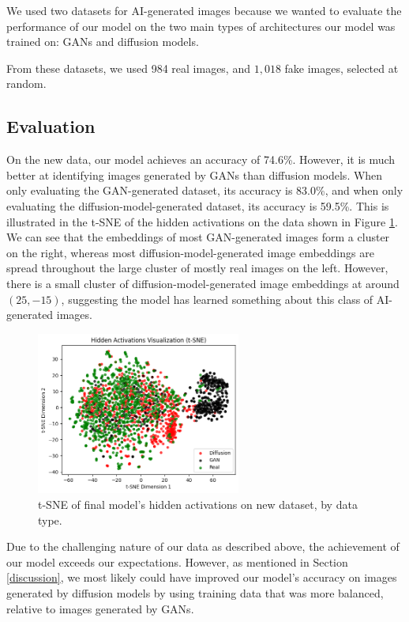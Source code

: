 \documentclass{article} %
\begin{document}
We used two datasets for AI-generated images because we wanted to evaluate the performance of our model on the two main types of architectures our model was trained on: GANs and diffusion models.

From these datasets, we used 984 real images, and $1,018$ fake images, selected at random.

\subsection{Evaluation}

On the new data, our model achieves an accuracy of 74.6\%. However, it is much better at identifying images generated by GANs than diffusion models. When only evaluating the GAN-generated dataset, its accuracy is 83.0\%, and when only evaluating the diffusion-model-generated dataset, its accuracy is 59.5\%. This is illustrated in the t-SNE of the hidden activations on the data shown in Figure \ref{fig:new_data_tsne}. We can see that the embeddings of most GAN-generated images form a cluster on the right, whereas most diffusion-model-generated image embeddings are spread throughout the large cluster of mostly real images on the left. However, there is a small cluster of diffusion-model-generated image embeddings at around $(25, -15)$, suggesting the model has learned something about this class of AI-generated images.

\begin{figure}[h]
    \begin{center}
        \includegraphics[width=0.6\textwidth]{figs/tsne.png}
    \end{center}
    \caption{t-SNE of final model's hidden activations on new dataset, by data type.}
    \label{fig:new_data_tsne}
\end{figure}

Due to the challenging nature of our data as described above, the achievement of our model exceeds our expectations. However, as mentioned in Section \ref{discussion}, we most likely could have improved our model's accuracy on images generated by diffusion models by using training data that was more balanced, relative to images generated by GANs.
\end{document}
